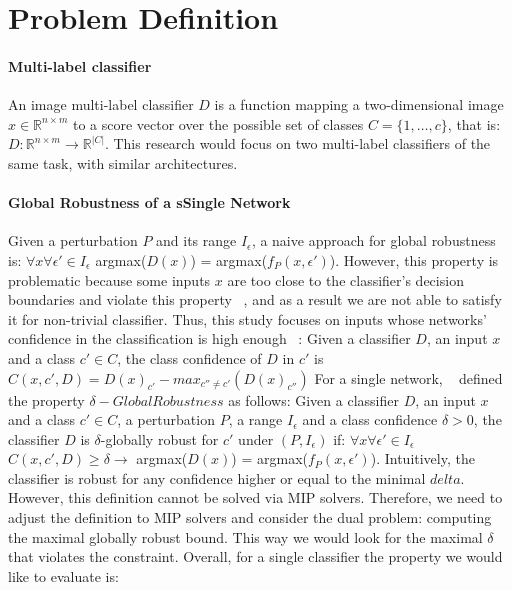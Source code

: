 
\section{Problem Definition}

\sloppy
\paragraph{Multi-label classifier}
An image multi-label classifier $D$ is a function mapping a two-dimensional image $x\in \mathbb{R}^{n \times m}$ to a score vector over the possible set of classes $C=\{1,\ldots,c\}$, that is:
$D: \mathbb{R}^{n \times m} \rightarrow {\mathbb{R}}^{|C|}$.
This research would focus on two multi-label classifiers of the same task, with similar architectures.


\paragraph{Global Robustness of a sSingle Network}
Given a perturbation $P$ and its range $I_\epsilon$, a naive approach for global robustness is:
$\forall{x}\forall{\epsilon'}\in{I_\epsilon}$  argmax($D(x)$) = argmax($f_P(x,\epsilon')$).
However, this property is problematic because some inputs $x$ are too close to the classifier's decision boundaries and violate this property ~\cite{DECISIONBOUND}, and as a result we are not able to satisfy it for non-trivial classifier. Thus, this study focuses on inputs whose networks' confidence in the classification is high enough ~\cite{VHAGAR}:
Given a classifier $D$, an input $x$ and a class $c'\in{C}$, the class confidence of $D$ in $c'$ is $C(x,c',D)=D(x)_{c'}-max_{c''\ne c'}(D(x)_{c''})$
For a single network, ~\cite{VHAGAR} defined the property $\delta-Global Robustness$ as follows:
Given a classifier $D$, an input $x$ and a class $c'\in{C}$, a perturbation $P$, a range $I_\epsilon$ and a class confidence $\delta>0$, the classifier $D$ is $\delta$-globally robust for $c'$ under $(P,I_\epsilon)$ if:
$\forall{x}\forall{\epsilon'}\in{I_\epsilon}$ $C(x,c',D) \geq \delta \rightarrow$ argmax($D(x)$) = argmax($f_P(x,\epsilon')$).
Intuitively, the classifier is robust for any confidence higher or equal to the minimal $delta$. However, this definition cannot be solved via MIP solvers. Therefore, we need to adjust the definition to MIP solvers and consider the dual problem: computing the maximal globally robust bound. This way we would look for the maximal $\delta$ that violates the constraint. Overall, for a single classifier the property we would like to evaluate is:

